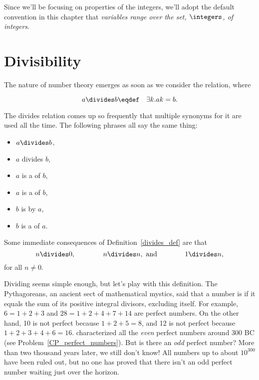 
Since we'll be focusing on properties of the integers, we'll adopt the default convention
in this chapter that \emph{variables range over the set, $\integers$, of integers}.

\section{Divisibility}\label{divisibility_sec}

The nature of number theory emerges as soon as we consider the  relation,
where
\begin{definition}\label{divides_def}
\[
a \divides b \eqdef\quad \exists k. ak = b.
\]
\end{definition}
The divides relation comes up so frequently that multiple synonyms for it are used all the
time.  The following phrases all say the same thing:
\begin{itemize}
\item $a \divides b$,
\item $a$ divides $b$,
\item $a$ is a  of $b$,
\item $a$ is a  of $b$,
\item $b$ is  by $a$,
\item $b$ is a  of $a$.
\end{itemize}
Some immediate consequences of Definition~\ref{divides_def} are that
\[
n  \divides 0,\qquad\qquad
n  \divides n, \text{ and}\qquad\qquad
1  \divides n,
\]
for all $n \neq 0$.

Dividing seems simple enough, but let's play with this definition.  The Pythagoreans, an
ancient sect of mathematical mystics, said that a number is  if it equals the sum of its positive integral divisors, excluding
itself.  For example, $6 = 1 + 2 + 3$ and $28 = 1 + 2 + 4 + 7 + 14$ are perfect numbers.
On the other hand, 10 is not perfect because $1 + 2 + 5 = 8$, and 12 is not perfect because
$1 + 2 + 3 + 4 + 6 = 16$.   characterized all the \emph{even} perfect numbers
around 300 BC (see Problem~\ref{CP_perfect_numbers}).  But is there an \emph{odd} perfect
number?  More than two thousand years later, we still don't know!  All numbers up to about
$10^{300}$ have been ruled out, but no one has proved that there isn't an odd perfect
number waiting just over the horizon.

